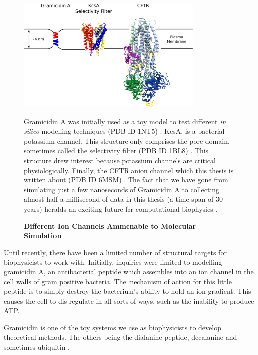 \begin{figure}
	\begin{center}
		\includegraphics[width=0.8\textwidth]{figures/ion_channel_progression.pdf}
	\end{center}
	\captionsetup{singlelinecheck = false, justification=raggedright}
	\caption[Different Ion Channels Ammenable to Molecular Simulation] {\textbf{Different Ion Channels Ammenable to Molecular Simulation}}{Gramicidin A was initially used as a toy model to test different \textit{in silico} modelling techniques (PDB ID 1NT5) \cite{sham2003}. KcsA, is a bacterial potassium channel. This structure only comprises the pore domain, sometimes called the selectivity filter (PDB ID 1BL8) \cite{doyle1998}. This structure drew interest because potassium channels are critical physiologically. Finally, the CFTR anion channel which this thesis is written about (PDB ID 6MSM) \cite{zhang2018a}. The fact that we have gone from simulating just a few nanoseconds of Gramicidin A to collecting almost half a millisecond of data in this thesis (a time span of 30 years) heralds an exciting future for computational biophysics \cite{roux1993}.}
	\label{action_potential_graphic}
\end{figure}

Until recently, there have been a limited number of structural targets for biophysicists to work with. Initially, inquiries were limited to modelling gramicidin A, an antibacterial peptide which assembles into an ion channel in the cell walls of gram positive bacteria\cite{liou2015}. The mechanism of action for this little peptide is to simply destroy the bacterium's ability to hold an ion gradient. This causes the cell to dis regulate in all sorts of ways, such as the inability to produce ATP.

Gramicidin is one of the toy systems we use as biophysicists to develop theoretical methods. The others being the dialanine peptide, decalanine and sometimes ubiquitin \cite{}.

